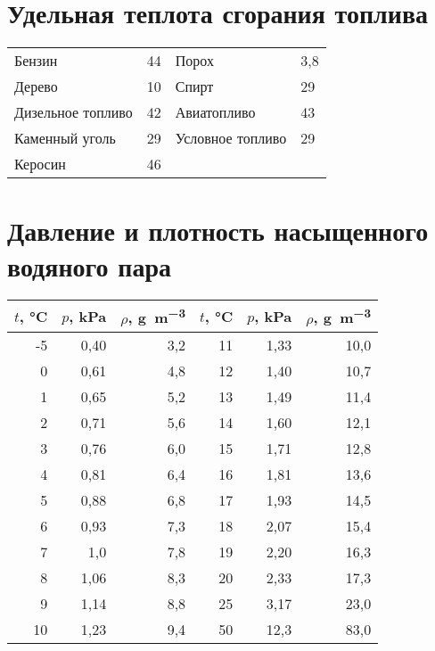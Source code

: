 \documentclass[a4paper,12pt]{article}
\begin{document}
\section*{Удельная теплота сгорания топлива}
\begin{tabular}{@{}llll@{}}
\toprule
Бензин & 44 & Порох & 3,8 \\
Дерево & 10 & Спирт & 29 \\
Дизельное топливо & 42 & Авиатопливо & 43 \\
Каменный уголь & 29 & Условное топливо & 29 \\
Керосин & 46 & & \\
\bottomrule
\end{tabular}

\section*{Давление и плотность насыщенного водяного пара}
\begin{tabular}{@{}rrr|rrr@{}}
\toprule
$t$, \si{\celsius} & $p$, \si{\kilo\pascal} & $\rho$, \si{\gram\per\cubic\meter} & 
$t$, \si{\celsius} & $p$, \si{\kilo\pascal} & $\rho$, \si{\gram\per\cubic\meter} \\
\midrule
-5 & 0,40 & 3,2 & 11 & 1,33 & 10,0 \\
0 & 0,61 & 4,8 & 12 & 1,40 & 10,7 \\
1 & 0,65 & 5,2 & 13 & 1,49 & 11,4 \\
2 & 0,71 & 5,6 & 14 & 1,60 & 12,1 \\
3 & 0,76 & 6,0 & 15 & 1,71 & 12,8 \\
4 & 0,81 & 6,4 & 16 & 1,81 & 13,6 \\
5 & 0,88 & 6,8 & 17 & 1,93 & 14,5 \\
6 & 0,93 & 7,3 & 18 & 2,07 & 15,4 \\
7 & 1,0 & 7,8 & 19 & 2,20 & 16,3 \\
8 & 1,06 & 8,3 & 20 & 2,33 & 17,3 \\
9 & 1,14 & 8,8 & 25 & 3,17 & 23,0 \\
10 & 1,23 & 9,4 & 50 & 12,3 & 83,0 \\
\bottomrule
\end{tabular}
\end{document}

